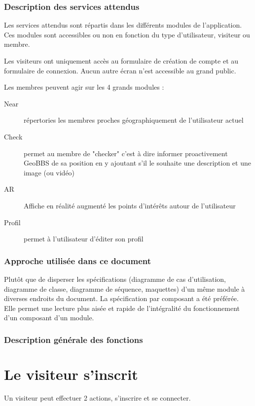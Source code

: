 \documentclass[a4paper,12pt]{report}
\begin{document}
\begin{onehalfspace}
\subsection{Description des services attendus}

Les services attendus sont répartis dans les différents modules de l’application. Ces modules sont accessibles ou non en fonction du type d’utilisateur, visiteur ou membre.

Les visiteurs ont uniquement accès au formulaire de création de compte et au formulaire de connexion. Aucun autre écran n’est accessible au grand public.

Les membres peuvent agir sur les 4 grands modules :
\begin{description}
  \item[Near] répertories les membres proches géographiquement de l'utilisateur actuel
  \item[Check] permet au membre de "checker" c'est à dire informer proactivement GeoBBS de sa position en y ajoutant s'il le souhaite une description et une image (ou vidéo)
  \item[AR] Affiche en réalité augmenté les points d'intérêts autour de l'utilisateur
  \item[Profil] permet à l'utilisateur d'éditer son profil
\end{description}

\subsection{Approche utilisée dans ce document} %
\label{sub:approche_utilis_e_dans_ce_document}
Plutôt que de disperser les spécifications (diagramme de cas d’utilisation, diagramme de classe, diagramme de séquence, maquettes) d’un même module à diverses endroits du document. La spécification par composant a été préférée. Elle permet une lecture plus aisée et rapide de l’intégralité du fonctionnement d’un composant d’un module.

\subsection{Description générale des fonctions} %
\label{sub:description_g_n_rale_des_fonctions}

\chapter{Le visiteur s’inscrit}
Un visiteur peut effectuer 2 actions, s’inscrire et se connecter.


\end{onehalfspace}
\end{document}
